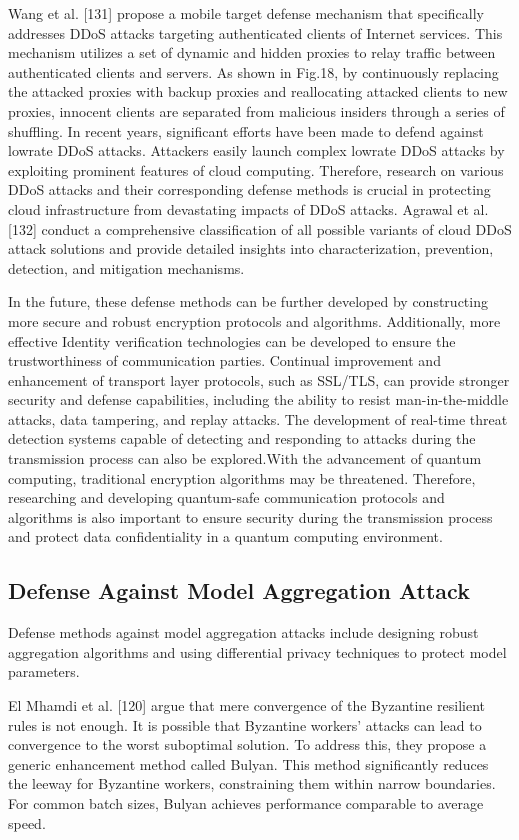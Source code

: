 Wang et al. [131] propose a mobile target defense mechanism that specifically
addresses DDoS attacks targeting authenticated clients of Internet services.
This mechanism utilizes a set of dynamic and hidden proxies to relay traﬀic
between authenticated clients and servers. As shown in Fig.18, by continuously
replacing the attacked proxies with backup proxies and reallocating attacked
clients to new proxies, innocent clients are separated from malicious insiders
through a series of shuffling. In recent years, significant efforts have been
made to defend against lowrate DDoS attacks. Attackers easily launch complex
lowrate DDoS attacks by exploiting prominent features of cloud computing.
Therefore, research on various DDoS attacks and their corresponding defense
methods is crucial in protecting cloud infrastructure from devastating impacts
of DDoS attacks. Agrawal et al. [132] conduct a comprehensive classification of
all possible variants of cloud DDoS attack solutions and provide detailed
insights into characterization, prevention, detection, and mitigation mechanisms.

In the future, these defense methods can be further
developed by constructing more secure and robust
encryption protocols and algorithms. Additionally, more effective
Identity verification technologies can be developed to
ensure the trustworthiness of communication parties.
Continual improvement and enhancement of transport layer
protocols, such as SSL/TLS, can provide stronger security
and defense capabilities, including the ability to resist
man-in-the-middle attacks, data tampering, and replay
attacks. The development of real-time threat detection
systems capable of detecting and responding to attacks
during the transmission process can also be explored.With
the advancement of quantum computing, traditional
encryption algorithms may be threatened. Therefore,
researching and developing quantum-safe communication
protocols and algorithms is also important to ensure
security during the transmission process and protect data
confidentiality in a quantum computing environment. 

\subsection{Defense Against Model Aggregation Attack}  
Defense methods against model aggregation attacks
include designing robust aggregation algorithms and using
differential privacy techniques to protect model parameters.

El Mhamdi et al. [120] argue that mere convergence of
the Byzantine resilient rules is not enough. It is possible
that Byzantine workers' attacks can lead to convergence
to the worst suboptimal solution. To address this, they
propose a generic enhancement method called Bulyan.
This method significantly reduces the leeway for
Byzantine workers, constraining them within narrow boundaries.
For common batch sizes, Bulyan achieves performance
comparable to average speed. 

